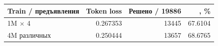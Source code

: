 \begin{tabular}{lrrr}
\toprule
Train / предъявления & Token loss & Решено / 19886 & \pass{}, \% \\
\midrule
1M $\times$ 4 & 0.267353 & 13445 & 67.6104 \\
4M различных & 0.250444 & 13657 & 68.6765 \\
\bottomrule
\end{tabular}
